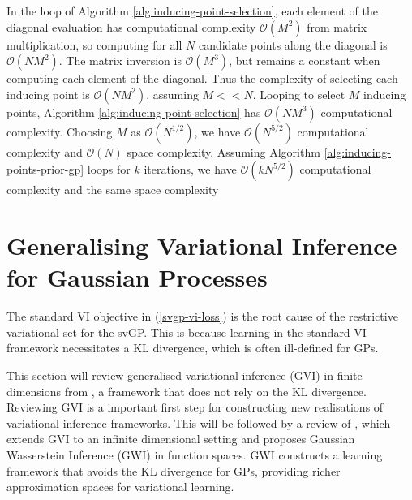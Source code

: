 \documentclass{article}
\numberwithin{equation}{section}
\begin{document}
In the loop of Algorithm \ref{alg:inducing-point-selection}, each element of the diagonal evaluation has computational complexity $\mathcal{O}(M^2)$ from matrix multiplication, so computing for all $N$ candidate points along the diagonal is $\mathcal{O}(NM^2)$.
The matrix inversion is $\mathcal{O}(M^3)$, but remains a constant when computing each element of the diagonal.
Thus the complexity of selecting each inducing point is $\mathcal{O}(NM^2)$, assuming $M << N$.
Looping to select $M$ inducing points, Algorithm \ref{alg:inducing-point-selection} has $\mathcal{O}(NM^3)$ computational complexity.
Choosing $M$ as $\mathcal{O}(N^{1/2})$, we have $\mathcal{O}(N^{5/2})$ computational complexity and $\mathcal{O}(N)$ space complexity. 
Assuming Algorithm \ref{alg:inducing-points-prior-gp} loops for $k$ iterations, we have $\mathcal{O}(k N^{5/2})$ computational complexity and the same space complexity



\newpage
\section{Generalising Variational Inference for Gaussian Processes}\label{section:gvi-for-gps}
The standard VI objective in (\ref{svgp-vi-loss}) is the root cause of the restrictive variational set for the svGP. 
This is because learning in the standard VI framework necessitates a KL divergence, which is often ill-defined for GPs.

This section will review generalised variational inference (GVI) in finite dimensions from \cite{knoblauch2022optimization}, a framework that does not rely on the KL divergence.
Reviewing GVI is a important first step for constructing new realisations of variational inference frameworks.
This will be followed by a review of \cite{wild2022generalized}, which extends GVI to an infinite dimensional setting and proposes Gaussian Wasserstein Inference (GWI) in function spaces.
GWI constructs a learning framework that avoids the KL divergence for GPs, providing richer approximation spaces for variational learning.
\end{document}
